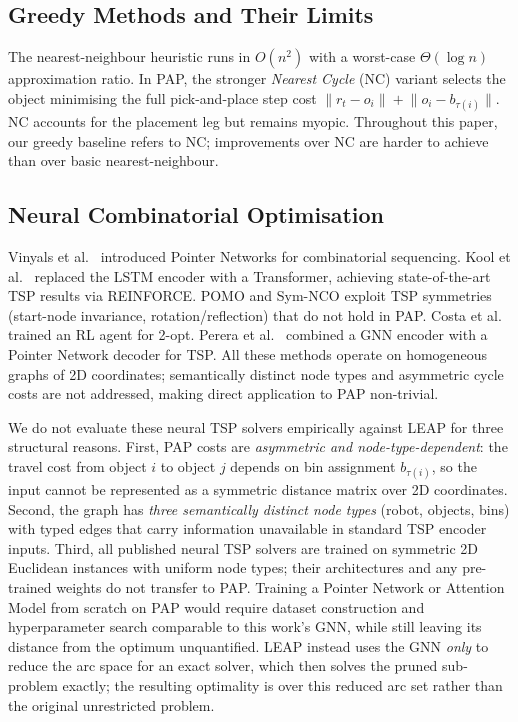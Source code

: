 \documentclass[review,times]{elsarticle}
\begin{document}
\subsection{Greedy Methods and Their Limits}

The nearest-neighbour heuristic \cite{rosenkrantz1977} runs in $O(n^2)$ with a worst-case $\Theta(\log n)$ approximation ratio. In PAP, the stronger \emph{Nearest Cycle} (NC) variant selects the object minimising the full pick-and-place step cost $\lVert r_t - o_i \rVert + \lVert o_i - b_{\tau(i)} \rVert$. NC accounts for the placement leg but remains myopic. Throughout this paper, our greedy baseline refers to NC; improvements over NC are harder to achieve than over basic nearest-neighbour.

\subsection{Neural Combinatorial Optimisation}

Vinyals et al.\ \cite{vinyals2015pointer} introduced Pointer Networks for combinatorial sequencing. Kool et al.\ \cite{kool2019attention} replaced the LSTM encoder with a Transformer, achieving state-of-the-art TSP results via REINFORCE. POMO \cite{kwon2020pomo} and Sym-NCO \cite{kim2022symnco} exploit TSP symmetries (start-node invariance, rotation/reflection) that do not hold in PAP. Costa et al.\ \cite{costa2020learning2opt} trained an RL agent for 2-opt. Perera et al.\ \cite{perera2023gpn} combined a GNN encoder with a Pointer Network decoder for TSP. All these methods operate on homogeneous graphs of 2D coordinates; semantically distinct node types and asymmetric cycle costs are not addressed, making direct application to PAP non-trivial.

We do not evaluate these neural TSP solvers empirically against LEAP for three structural reasons. First, PAP costs are \emph{asymmetric and node-type-dependent}: the travel cost from object $i$ to object $j$ depends on bin assignment $b_{\tau(i)}$, so the input cannot be represented as a symmetric distance matrix over 2D coordinates. Second, the graph has \emph{three semantically distinct node types} (robot, objects, bins) with typed edges that carry information unavailable in standard TSP encoder inputs. Third, all published neural TSP solvers are trained on symmetric 2D Euclidean instances with uniform node types; their architectures and any pre-trained weights do not transfer to PAP. Training a Pointer Network or Attention Model from scratch on PAP would require dataset construction and hyperparameter search comparable to this work's GNN, while still leaving its distance from the optimum unquantified. LEAP instead uses the GNN \emph{only} to reduce the arc space for an exact solver, which then solves the pruned sub-problem exactly; the resulting optimality is over this reduced arc set rather than the original unrestricted problem.
\end{document}
